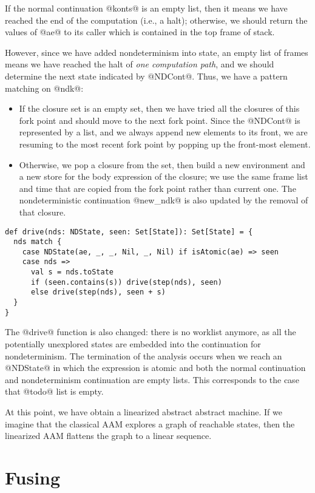 \documentclass[acmsmall]{acmart}\settopmatter{}
\begin{document}
If the normal continuation @konts@ is an empty list, then it means we have reached
the end of the computation (i.e., a halt); otherwise, we should return the values of @ae@ to its caller which is contained in the top frame of stack.

However, since we have added nondeterminism into state, an empty list of frames means
we have reached the halt of \textit{one computation path}, and we should
determine the next state indicated by @NDCont@.
Thus, we have a pattern matching on @ndk@:
\begin{itemize}
  \item If the closure set is an empty set,
then we have tried all the closures of this fork point and should move to the
next fork point. Since the @NDCont@ is represented by a list, and we always
append new elements to its front, we are resuming to the most recent fork point by
popping up the front-most element.
  \item Otherwise, we pop a closure from the set, then build a new
environment and a new store for the body expression of the closure;
we use the same frame list and time that are copied from the fork point rather
than current one.
The nondeterministic continuation @new_ndk@ is also updated by the removal of that closure.
\end{itemize}

\begin{lstlisting}
def drive(nds: NDState, seen: Set[State]): Set[State] = {
  nds match {
    case NDState(ae, _, _, Nil, _, Nil) if isAtomic(ae) => seen
    case nds =>
      val s = nds.toState
      if (seen.contains(s)) drive(step(nds), seen)
      else drive(step(nds), seen + s)
  }
}
\end{lstlisting}

The @drive@ function is also changed: there is no worklist anymore, as all the
potentially unexplored states are embedded into the continuation for
nondeterminism.
The termination of the analysis occurs when we reach an @NDState@ in which the expression
is atomic and both the normal continuation and nondeterminism continuation are
empty lists. This corresponds to the case that @todo@ list is empty.

At this point, we have obtain a linearized abstract abstract machine. If we imagine that the
classical AAM explores a graph of reachable states, then the linearized AAM flattens the
graph to a linear sequence.

\section{Fusing} \label{fusing}
\end{document}
